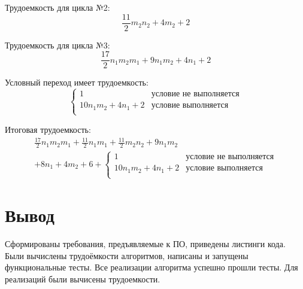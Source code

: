 Трудоемкость для цикла №2:
\begin{equation}
\frac{11}{2}m_2n_2+ 4m_2 + 2
\end{equation}

Трудоемкость для цикла №3:
\begin{equation}
	\frac{17}{2}n_1m_2m_1 + 9n_1m_2 + 4n_1 + 2
\end{equation}



Условный переход имеет трудоемкость:
\begin{equation}
\begin{cases}
	1    &\text{условие не выполняется}\\
	10n_1m_2 + 4n_1 + 2 &\text{условие выполняется}\\
\end{cases}
\end{equation}

Итоговая трудоемкость:
\begin{align*}
 \frac{17}{2}n_1m_2m_1 + \frac{11}{2}n_1m_1 + \frac{11}{2}m_2n_2 + 9n_1m_2 \\
  + 8n_1 + 4m_2 + 6 + \begin{cases}
	1    &\text{условие не выполняется}\\
	10n_1m_2 + 4n_1 + 2 &\text{условие выполняется}\\
  \end{cases}
\end{align*}

\section*{Вывод}

Сформированы требования, предъявляемые к ПО, приведены листинги кода.
Были вычислены трудоёмкости алгоритмов, написаны и запущены функциональные тесты.
Все реализации алгоритма успешно прошли тесты.
Для реализаций были вычисены трудоемкости.